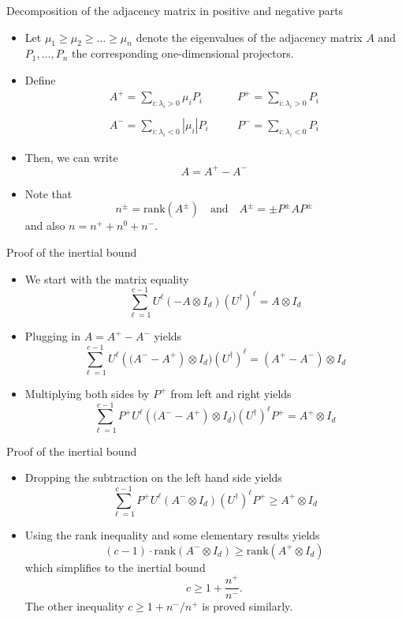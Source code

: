 \documentclass{beamer}
\renewcommand{\>}{\rangle}
\newcommand{\<}{\langle}
\begin{document}
%

\begin{frame}{Decomposition of the adjacency matrix in positive and negative parts}

\begin{itemize}
\item Let $\mu_1\ge \mu_2\ge \ldots \ge \mu_n$ denote the eigenvalues of the adjacency matrix $A$ and $P_1,\ldots,P_n$ the corresponding one-dimensional projectors.

\item Define 
\[
\begin{array}{lll}
A^+ = \sum_{i : \lambda_i > 0} \mu_i P_i & \quad &
P^+ = \sum_{i : \lambda_i > 0} P_i \\
\\
A^- = \sum_{i : \lambda_i < 0} |\mu_i| P_i & \quad &
P^- = \sum_{i : \lambda_i < 0} P_i 
\end{array}
\]
\item 
Then, we can write
\[
A = A^+ - A^-
\]
\item Note that
\[
n^{\pm} = \mathrm{rank}(A^{\pm})
\quad\mbox{and}\quad
A^{\pm} = \pm P^{\pm} A P^{\pm}
\]
and also $n=n^+ + n^0 + n^-$.
\end{itemize}

\end{frame}

%

\begin{frame}{Proof of the inertial bound}
\begin{itemize}
\item We start with the matrix equality
\[
\sum_{\ell=1}^{c-1} U^\ell (-A\otimes I_d) (U^\dagger)^\ell = A \otimes I_d
\]
\item Plugging in $A=A^+ - A^-$ yields
\[
\sum_{\ell=1}^{c-1} U^\ell \left((A^- - A^+\right) \otimes I_d) (U^\dagger)^\ell = (A^+ - A^-) \otimes I_d
\]
\item Multiplying both sides by $P^+$ from left and right yields
\[
\sum_{\ell=1}^{c-1} P^+ U^\ell \left((A^- - A^+\right) \otimes I_d) (U^\dagger)^\ell P^+= A^+ \otimes I_d
\]
\end{itemize}
\end{frame}

%

\begin{frame}{Proof of the inertial bound}
\begin{itemize}
\item Dropping the subtraction on the left hand side yields
\[
\sum_{\ell=1}^{c-1} P^+ U^\ell (A^-  \otimes I_d) (U^\dagger)^\ell P^+ \ge A^+ \otimes I_d
\]
\item Using the rank inequality and some elementary results yields
\[
(c-1) \cdot \mathrm{rank} (A^- \otimes I_d) \ge \mathrm{rank}(A^+ \otimes I_d)
\]
which simplifies to the inertial bound
\[
c \ge 1 + \frac{n^+}{n^-}.
\]
The other inequality $c \ge 1 + n^-/n^+$ is proved similarly.
\end{itemize}
\end{frame}
\end{document}
